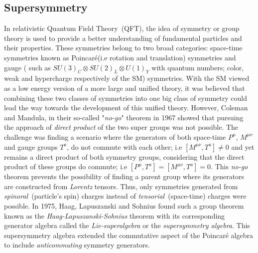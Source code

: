 \subsection{Supersymmetry}
In relativistic Quantum Field Theory~(QFT), the idea of symmetry or group theory is used to provide a better understanding of fundamental particles and their properties. These symmetries belong to two broad categories: space-time symmetries known as Poincar\'{e}(i.e rotation and translation) symmetries and gauge ( such as $SU(3)_{C}\otimes SU(2)_{L}\otimes U(1)_{Y}$ with quantum numbers; color, weak and hypercharge respectively of the SM) symmetries. With the SM viewed as a low energy version of a more large and unified theory,  
it was believed that combining these two classes of symmetries into one big class of symmetry could lead the way towards the development of this unified theory. However, Coleman and Mandula\cite{SUSY}, in their so-called "\textit{no-go}" theorem in 1967  showed that pursuing the approach of \textit{direct product} of the two super groups  was not possible. %
The challenge was finding a scenario where the generators of both space-time $P^{\mu}$, $M^{\mu\nu} $  and gauge groups $T^{a}$, do not commute with each other; i.e $ \left[M^{\mu\nu}, T^{a}\right] \neq 0$ and yet remains a direct product of both symmetry groups, considering that the direct product of these groups do commute; i.e
$ \left[P^{\mu}, T^{a}\right] = \left[M^{\mu\nu}, T^{a}\right] = 0$. 
\newline
This \textit{no-go} theorem prevents the possibility of finding a parent group where its generators are constructed from \textit{Lorentz} tensors. Thus, only symmetries  generated from \textit{spinoral}~(particle's spin) charges instead of \textit{tensorial}~(space-time) charges were possible. In 1975, Haag, Lapuszanski and Sohnius \cite{MSUSY} found such a group theorem known as the \textit{Haag-Lapuszanski-Sohnius} theorem with its corresponding generator algebra called the \textit{Lie-superalgebra} or the \textit{supersymmetry algebra}.  This supersymmetry algebra extended the commutative aspect of the Poincar\'{e} algebra to include \textit{anticommuting} symmetry generators.
